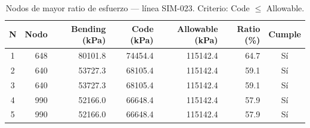 \begin{table}[htbp]
  \centering
  \small
  \caption{Nodos de mayor ratio de esfuerzo — línea SIM-023. Criterio: Code $\leq$ Allowable.}
  \label{tab:top5-ratio}
  \begin{tabular}{crrrrrc}
    \toprule
    N & Nodo & Bending (\si{kPa}) & Code (\si{kPa}) & Allowable (\si{kPa}) & Ratio (\%) & Cumple \\
    \midrule
    1 & 648 & \num{80101.8} & \num{74454.4} & \num{115142.4} & 64.7 & Sí \\
    2 & 640 & \num{53727.3} & \num{68105.4} & \num{115142.4} & 59.1 & Sí \\
    3 & 640 & \num{53727.3} & \num{68105.4} & \num{115142.4} & 59.1 & Sí \\
    4 & 990 & \num{52166.0} & \num{66648.4} & \num{115142.4} & 57.9 & Sí \\
    5 & 990 & \num{52166.0} & \num{66648.4} & \num{115142.4} & 57.9 & Sí \\
    \bottomrule
  \end{tabular}
\end{table}
